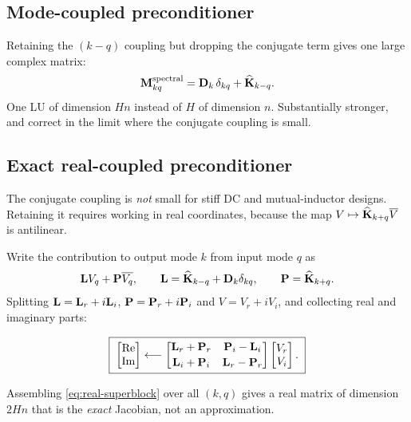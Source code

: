 \subsection{Mode-coupled preconditioner}

Retaining the $(k-q)$ coupling but dropping the conjugate term gives one large
complex matrix:
\begin{equation}
  \mathbf{M}^{\mathrm{spectral}}_{kq} = \mathbf{D}_k\,\delta_{kq} + \widehat{\mathbf{K}}_{k-q}.
  \label{eq:precond-spectral}
\end{equation}
One LU of dimension $Hn$ instead of $H$ of dimension $n$. Substantially
stronger, and correct in the limit where the conjugate coupling is small.

\subsection{Exact real-coupled preconditioner}
\label{sec:real-coupled}

The conjugate coupling is \emph{not} small for stiff DC and mutual-inductor
designs. Retaining it requires working in real coordinates, because the map
$V\mapsto \widehat{\mathbf{K}}_{k+q}\overline{V}$ is antilinear.

Write the contribution to output mode $k$ from input mode $q$ as
\begin{equation}
  \mathbf{L}V_q + \mathbf{P}\overline{V_q},
  \qquad
  \mathbf{L} = \widehat{\mathbf{K}}_{k-q} + \mathbf{D}_k\delta_{kq},
  \qquad
  \mathbf{P} = \widehat{\mathbf{K}}_{k+q}.
\end{equation}
Splitting $\mathbf{L} = \mathbf{L}_r + i\mathbf{L}_i$, $\mathbf{P} = \mathbf{P}_r + i\mathbf{P}_i$
and $V = V_r + iV_i$, and collecting real and imaginary parts:

\begin{equation}
  \boxed{\;
  \begin{bmatrix} \operatorname{Re} \\ \operatorname{Im} \end{bmatrix}
  \longleftarrow
  \begin{bmatrix}
    \mathbf{L}_r + \mathbf{P}_r & \mathbf{P}_i - \mathbf{L}_i \\[2pt]
    \mathbf{L}_i + \mathbf{P}_i & \mathbf{L}_r - \mathbf{P}_r
  \end{bmatrix}
  \begin{bmatrix} V_r \\ V_i \end{bmatrix}.
  \;}
  \label{eq:real-superblock}
\end{equation}

Assembling \eqref{eq:real-superblock} over all $(k,q)$ gives a real matrix of
dimension $2Hn$ that is the \emph{exact} Jacobian, not an approximation.

